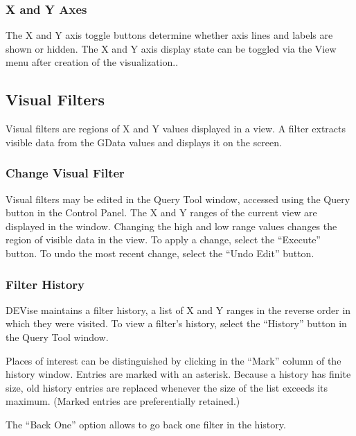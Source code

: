 \subsubsection{X and Y Axes}

The X and Y axis toggle buttons determine whether axis lines and labels are
shown or hidden. The X and Y axis display state can be toggled via the View menu
after creation of the visualization..


\subsection{Visual Filters}

Visual filters are regions of X and Y values displayed in a view. A filter
extracts visible data from the GData values and displays it on the screen.

\subsubsection{Change Visual Filter}

Visual filters may be edited in the Query Tool window, accessed using the Query
button in the Control Panel. The X and Y ranges of the current view are
displayed in the window. Changing the high and low range values changes the
region of visible data in the view. To apply a change, select the ``Execute''
button. To undo the most recent change, select the ``Undo Edit'' button.

\subsubsection{Filter History}

DEVise maintains a filter history, a list of X and Y ranges in the reverse order
in which they were visited. To view a filter's history, select the ``History'' button in the Query Tool window.

Places of interest can be distinguished by clicking in the ``Mark'' column of
the history window. Entries are marked with an asterisk.  Because a history has
finite size, old history entries are replaced whenever the size of the list
exceeds its maximum. (Marked entries are preferentially retained.)

The ``Back One'' option allows to go back one filter in the history.


